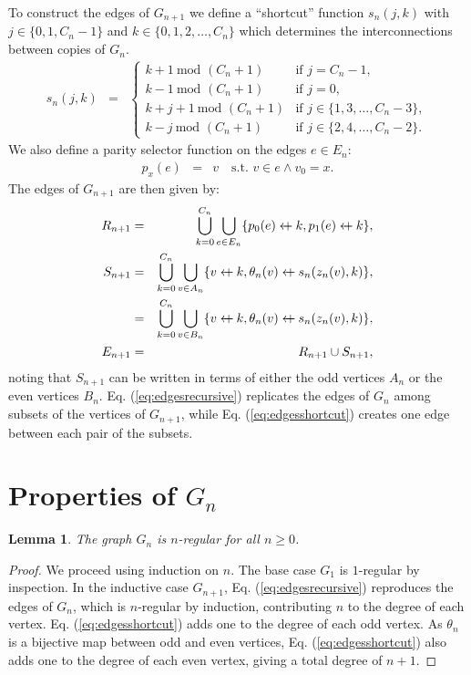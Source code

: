 \documentclass[twocolumn]{article}
\newcommand{\beq}{\begin{eqnarray}}
\newcommand{\eeq}{\end{eqnarray}}
\newcommand{\append}{\leftarrow{\mkern-18mu}{+}\:}
\newtheorem{lemma}{Lemma}
\begin{document}
To construct the edges of $G_{n+1}$ we define a ``shortcut'' function $s_n(j, k)$
with $j \in \{0, 1, C_n - 1\}$ and $k \in \{0, 1, 2, \ldots, C_n\}$ which
determines the interconnections between copies of $G_n$.
\beq
\label{eq:shortcut}
s_{n}(j, k)
&=&
\begin{cases}
k + 1 \ \mbox{mod } (C_n + 1)
&
\mbox{if } j = C_n - 1,
\\
k - 1 \ \mbox{mod } (C_n + 1)
&
\mbox{if } j = 0,
\\
k + j + 1 \ \mbox{mod } (C_n + 1)
&
\mbox{if } j \in \{1, 3, \ldots, C_n - 3\},
\\
k - j \ \mbox{mod } (C_n + 1)
&
\mbox{if } j \in \{2, 4, \ldots, C_n - 2\}.
\end{cases}
\eeq
We also define a parity selector function on the edges $e \in E_n$:
\beq
p_x(e)
&=&
v \quad \mbox{s.t. } v \in e \land v_0 = x.
\eeq
The edges of $G_{n+1}$ are then given by:
\beq
\label{eq:edgesrecursive}
R_{n+1}
&=&
\bigcup_{k=0}^{C_n}
\bigcup_{e \in E_n} \{ p_0(e) \append k, p_1(e) \append k\},
\\
\label{eq:edgesshortcut}
S_{n+1}
&=&
\bigcup_{k=0}^{C_n}
\bigcup_{v \in A_n} \{ v \append k, \theta_n(v) \append s_n(z_n(v), k) \},
\\
&=&
\bigcup_{k=0}^{C_n}
\bigcup_{v \in B_n} \{ v \append k, \theta_n(v) \append s_n(z_n(v), k) \},
\\
E_{n+1}
&=&
R_{n+1} \cup S_{n+1},
\eeq
noting that $S_{n+1}$ can be written in terms of either the odd vertices $A_n$
or the even vertices $B_n$.
Eq. (\ref{eq:edgesrecursive}) replicates the edges of
$G_n$ among subsets of the vertices of $G_{n+1}$,
while Eq. (\ref{eq:edgesshortcut})
creates one edge between each pair of the subsets.

\section{Properties of $G_n$}

\begin{lemma}
\label{lem:regular}
The graph $G_n$ is $n$-regular for all $n \geq 0$.
\end{lemma}
\begin{proof}
We proceed using induction on $n$.
The base case $G_1$ is $1$-regular by inspection.
In the inductive case $G_{n+1}$,
Eq. (\ref{eq:edgesrecursive})
reproduces the edges of $G_n$,
which is $n$-regular by induction,
contributing $n$ to the degree of each vertex.
Eq. (\ref{eq:edgesshortcut}) adds one to the degree of each odd vertex.
As $\theta_n$ is a bijective map between odd and even vertices,
Eq. (\ref{eq:edgesshortcut}) also adds one to the degree of each even vertex,
giving a total degree of $n + 1$.
\end{proof}
\end{document}
